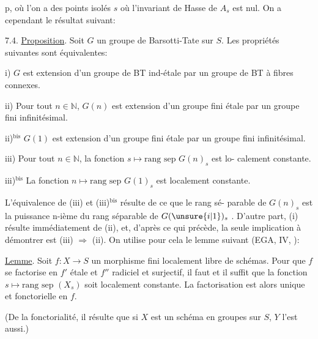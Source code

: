 
p, où l'on a des points isolés $s$ où l'invariant de Hasse de $A_s$ est
nul. On a cependant le résultat suivant:

7.4. \uline{Proposition}. Soit $G$ un groupe de Barsotti-Tate sur $S$. Les
propriétés suivantes sont équivalentes:

i) $G$ est extension d'un groupe de BT ind-étale par un groupe
de BT à fibres connexes.

ii) Pour tout $n \in \mathbb{N}$, $G(n)$ est extension d'un groupe fini
étale par un groupe fini infinitésimal.

ii)$^{\text{bis}}$ $G(1)$ est extension d'un groupe fini étale par un groupe
fini infinitésimal.

iii) Pour tout $n \in \mathbb{N}$, la fonction $s \mapsto \text{rang sep } G(n)_s$ est lo-%
calement constante.

iii)$^{\text{bis}}$ La fonction $n \mapsto \text{rang sep } G(1)_s$ est localement constante.

L'équivalence de (iii) et (iii)$^{\text{bis}}$ résulte de ce que le rang sé-%
parable de $G(n)_s$ est la puissance n-ième du rang séparable de $G(\unsure{i|1})_s$ .
D'autre part, (i) résulte immédiatement de (ii), et, d'après ce qui précède,
la seule implication à démontrer est (iii) $\Rightarrow$ (ii). On utilise pour cela
le lemme suivant (EGA, IV, ):

\uline{Lemme}. Soit $f : X \to S$ un morphisme fini localement libre de schémas.
Pour que $f$ se factorise en $f'$ étale et $f''$ radiciel et surjectif, il
faut et il suffit que la fonction $s \mapsto \text{rang sep } (X_s)$
soit localement constante. La factorisation est alors
unique et fonctorielle en $f$.

(De la fonctorialité, il résulte que si $X$ est un schéma en groupes sur
$S$, $Y$ l'est aussi.)

